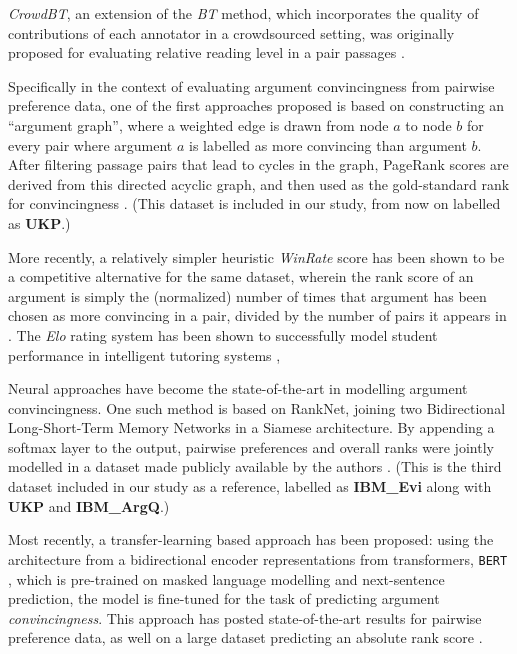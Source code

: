 \documentclass[notitlepage,12pt]{jedm}
\begin{document}
\textit{CrowdBT}, an extension of the \textit{BT} method, which incorporates 
the quality of contributions of each annotator in a crowdsourced setting, was
originally proposed for evaluating relative reading level in a pair passages 
\cite{chen_pairwise_2013}. 

Specifically in the context of evaluating argument convincingness from pairwise 
preference data, one of the first approaches proposed is based on constructing 
an ``argument graph'', where a weighted edge is drawn from node $a$ to node $b$ 
for every pair where argument $a$ is labelled as more convincing than argument 
$b$. 
After filtering passage pairs that lead to cycles in the graph, PageRank scores 
are derived from this directed acyclic graph, and then used as the 
gold-standard rank for convincingness \cite{habernal_which_2016}.
(This dataset is included in our study, from now on labelled as \textbf{UKP}.)

More recently, a relatively simpler heuristic \textit{WinRate} score has been 
shown to be a competitive alternative for the same dataset, wherein the rank 
score of an argument is simply the (normalized) number of times that argument 
has been chosen as more convincing in a pair, divided by the number of pairs it 
appears in \cite{potash_ranking_2019}.
The \textit{Elo} rating system has been shown to successfully model student 
performance in intelligent tutoring systems \cite{pelanek_applications_2016}, 

Neural approaches have become the state-of-the-art in modelling argument 
convincingness.
One such method is based on RankNet, joining two Bidirectional Long-Short-Term 
Memory Networks in a Siamese architecture. 
By appending a softmax layer to the output, pairwise preferences and overall 
ranks were jointly modelled in a dataset made publicly available by the authors 
\cite{gleize_are_2019}.
(This is the third dataset included in our study as a reference, labelled as 
\textbf{IBM\_Evi} along with \textbf{UKP} and \textbf{IBM\_ArgQ}.)

Most recently, a transfer-learning based approach has been proposed: using the 
architecture from a bidirectional encoder representations from transformers, 
\verb|BERT| \cite{devlin_bert_2018}, which is pre-trained on masked language 
modelling and next-sentence prediction, the model is fine-tuned for the task of 
predicting argument \textit{convincingness}.
This approach has posted state-of-the-art results for pairwise preference data, 
as well on a large dataset predicting an absolute rank score 
\cite{gretz_large-scale_2019}.
\end{document}
